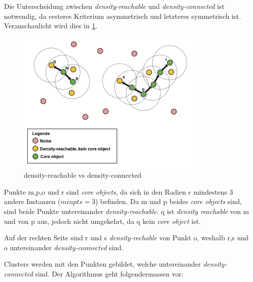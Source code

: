 Die Unterscheidung zwischen \textit{density-reachable} und \textit{density-connected} ist notwendig, da ersteres Kriterium asymmetrisch und letzteres symmetrisch ist. Veranschaulicht wird dies in \cref{fig:recherche:clusteranalysis:DBSCAN}.

\begin{figure}[H]
	\RawFloats
	\centering
	\includegraphics[width=0.8\textwidth]{images/density-reachable-vs-connected.png}
	\caption{density-reachable vs density-connected}
	\label{fig:recherche:clusteranalysis:DBSCAN}
\end{figure}

Punkte m,p,o und r sind \textit{core objects}, da sich in den Radien $\epsilon$ mindestens 3 andere Instanzen ($minpts = 3$) befinden. Da m und p beides \textit{core objects} sind, sind beide Punkte untereinander \textit{density-reachable}. q ist \textit{density reachable} von m und von p aus, jedoch nicht umgekehrt, da q kein \textit{core object} ist. 

Auf der rechten Seite sind r und s \textit{density-rechable} von Punkt o, weshalb r,s und o untereinander \textit{density-connected} sind.

Clusters werden mit den Punkten gebildet, welche untereinander \textit{density-connected} sind. 
Der Algorithmus geht folgendermassen vor:

